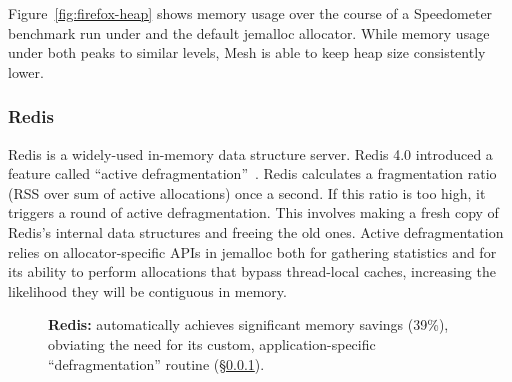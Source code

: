 Figure~\ref{fig:firefox-heap} shows memory usage over the course of a
Speedometer benchmark run under \Mesh and the default jemalloc
allocator.  While memory usage under both peaks to similar levels,
Mesh is able to keep heap size consistently lower.


\subsubsection{Redis}
\label{redis-section}


Redis is a widely-used in-memory data structure server.  Redis 4.0
introduced a feature called ``active
defragmentation''~\cite{jemalloc:exposehints,redis:announcement}.
Redis calculates a fragmentation ratio (RSS over sum of active
allocations) once a second.  If this ratio is too high, it triggers a
round of active defragmentation. This involves making a fresh copy of
Redis's internal data structures and freeing the old ones. Active
defragmentation relies on allocator-specific APIs in jemalloc both for
gathering statistics and for its ability to perform allocations that
bypass thread-local caches, increasing the likelihood they will be
contiguous in memory.

\begin{figure}[t!]
  \centering
  \caption{\textbf{Redis:} \Mesh automatically achieves significant
    memory savings (39\%), obviating the need for its custom,
    application-specific ``defragmentation'' routine
    (\S\ref{redis-section}).
    \label{fig:redis-results}}
\end{figure}





